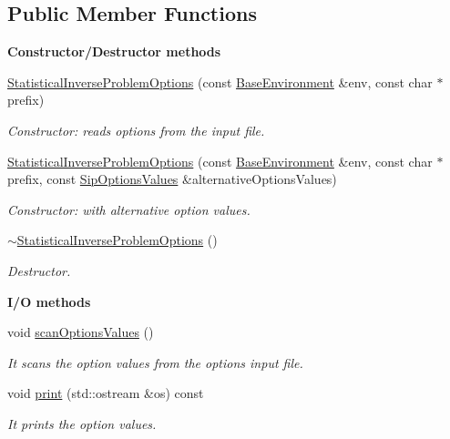 \subsection*{Public Member Functions}
\begin{Indent}{\bf Constructor/\-Destructor methods}\par
\begin{DoxyCompactItemize}
\item 
\hyperlink{class_q_u_e_s_o_1_1_statistical_inverse_problem_options_ae6f5401589bdfa56f0d3671305600301}{Statistical\-Inverse\-Problem\-Options} (const \hyperlink{class_q_u_e_s_o_1_1_base_environment}{Base\-Environment} \&env, const char $\ast$prefix)
\begin{DoxyCompactList}\small\item\em Constructor\-: reads options from the input file. \end{DoxyCompactList}\item 
\hyperlink{class_q_u_e_s_o_1_1_statistical_inverse_problem_options_a1338bf7f41712f3475195931f124127b}{Statistical\-Inverse\-Problem\-Options} (const \hyperlink{class_q_u_e_s_o_1_1_base_environment}{Base\-Environment} \&env, const char $\ast$prefix, const \hyperlink{class_q_u_e_s_o_1_1_sip_options_values}{Sip\-Options\-Values} \&alternative\-Options\-Values)
\begin{DoxyCompactList}\small\item\em Constructor\-: with alternative option values. \end{DoxyCompactList}\item 
\hyperlink{class_q_u_e_s_o_1_1_statistical_inverse_problem_options_a278d6b4e25dadb6346160f70b6c3bdff}{$\sim$\-Statistical\-Inverse\-Problem\-Options} ()
\begin{DoxyCompactList}\small\item\em Destructor. \end{DoxyCompactList}\end{DoxyCompactItemize}
\end{Indent}
\begin{Indent}{\bf I/\-O methods}\par
\begin{DoxyCompactItemize}
\item 
void \hyperlink{class_q_u_e_s_o_1_1_statistical_inverse_problem_options_a3ed629e5e6eb8d5e9b005c6c6810da91}{scan\-Options\-Values} ()
\begin{DoxyCompactList}\small\item\em It scans the option values from the options input file. \end{DoxyCompactList}\item 
void \hyperlink{class_q_u_e_s_o_1_1_statistical_inverse_problem_options_a5e06fc25408a43aad1240dada3f13a4e}{print} (std\-::ostream \&os) const 
\begin{DoxyCompactList}\small\item\em It prints the option values. \end{DoxyCompactList}\end{DoxyCompactItemize}
\end{Indent}
